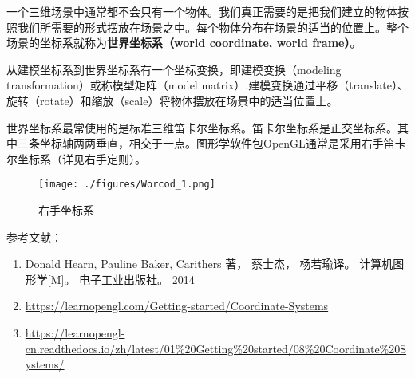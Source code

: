 

一个三维场景中通常都不会只有一个物体。我们真正需要的是把我们建立的物体按照我们所需要的形式摆放在场景之中。每个物体分布在场景的适当的位置上。整个场景的坐标系就称为\textbf{世界坐标系（world coordinate, world frame）}。

从建模坐标系到世界坐标系有一个坐标变换，即建模变换（modeling transformation）或称模型矩阵（model matrix）.建模变换通过平移（translate）、旋转（rotate）和缩放（scale）将物体摆放在场景中的适当位置上。

世界坐标系最常使用的是标准三维笛卡尔坐标系。笛卡尔坐标系是正交坐标系。其中三条坐标轴两两垂直，相交于一点。图形学软件包OpenGL通常是采用右手笛卡尔坐标系（详见右手定则）。


\begin{figure}[ht]
\centering
\texttt{[image: ./figures/Worcod\_1.png]}
\caption{右手坐标系} \label{Worcod_fig1}
\end{figure}


参考文献：
\begin{enumerate}
\item Donald Hearn, Pauline Baker, Carithers 著， 蔡士杰， 杨若瑜译。 计算机图形学[M]。 电子工业出版社。 2014
\item \href{https://learnopengl.com/Getting-started/Coordinate-Systems}{https://learnopengl.com/Getting-started/Coordinate-Systems}
\item \href{https://learnopengl-cn.readthedocs.io/zh/latest/01\%20Getting\%20started/08\%20Coordinate\%20Systems/}{https://learnopengl-cn.readthedocs.io/zh/latest/01\%20Getting\%20started/08\%20Coordinate\%20Systems/}
\end{enumerate}